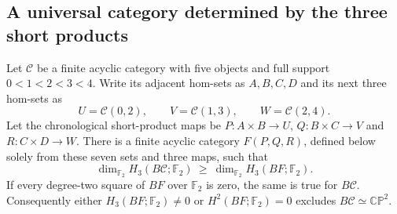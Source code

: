 \subsection{A universal category determined by the three short products}

\begin{theorem}
\label{A7:universal-short-model}
Let $\mathcal C$ be a finite acyclic category with five objects and
full support $0<1<2<3<4$. Write its adjacent hom-sets as $A,B,C,D$
and its next three hom-sets as
\[
 U=\mathcal C(0,2),\qquad V=\mathcal C(1,3),
 \qquad W=\mathcal C(2,4).
\]
Let the chronological short-product maps be
$P:A\times B\to U$, $Q:B\times C\to V$ and $R:C\times D\to W$.
There is a finite acyclic category $F(P,Q,R)$, defined below solely
from these seven sets and three maps, such that
\[
 \dim_{\mathbb F_2}H_3(B\mathcal C;\mathbb F_2)
 \ \geq\ \dim_{\mathbb F_2}H_3(BF;\mathbb F_2).
\]
If every degree-two square of $BF$ over $\mathbb F_2$ is zero,
the same is true for $B\mathcal C$. Consequently either
$H_3(BF;\mathbb F_2)\ne0$ or $H^2(BF;\mathbb F_2)=0$
excludes $B\mathcal C\simeq\mathbb{CP}^2$.
\end{theorem}
